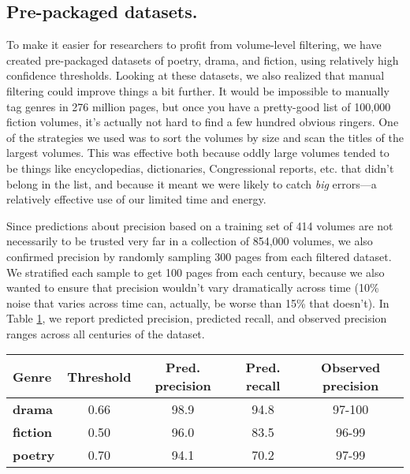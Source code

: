 \documentclass[paper=a4, fontsize=12pt]{scrartcl}
\numberwithin{equation}{section}		%
\numberwithin{figure}{section}			%
\numberwithin{table}{section}				%
\begin{document}
\subsection{Pre-packaged datasets.}

To make it easier for researchers to profit from volume-level filtering, we have created pre-packaged datasets of poetry, drama, and fiction, using relatively high confidence thresholds. Looking at these datasets, we also realized that manual filtering could improve things a bit further. It would be impossible to manually tag genres in 276 million pages, but once you have a pretty-good list of 100,000 fiction volumes, it's actually not hard to find a few hundred obvious ringers. One of the strategies we used was to sort the volumes by size and scan the titles of the largest volumes. This was effective both because oddly large volumes tended to be things like encyclopedias, dictionaries, Congressional reports, etc. that didn't belong in the list, and because it meant we were likely to catch \textit{big} errors---a relatively effective use of our limited time and energy.

Since predictions about precision based on a training set of 414 volumes are not necessarily to be trusted very far in a collection of 854,000 volumes, we also confirmed precision by randomly sampling 300 pages from each filtered dataset. We stratified each sample to get 100 pages from each century, because we also wanted to ensure that precision wouldn't vary dramatically across time (10\% noise that varies across time can, actually, be worse than 15\% that doesn't). In Table \ref{filteredtable}, we report predicted precision, predicted recall, and observed precision ranges across all centuries of the dataset.

\vspace{5mm}
\begin{table}[h]
\begin{tabular}{@{}lcccc@{}}
\toprule
\textbf{Genre}   & \textbf{Threshold} & \textbf{Pred. precision} & \textbf{Pred. recall} & \textbf{Observed precision} \\ \midrule
\textbf{drama}   & 0.66               & 98.9                     & 94.8                  & 97-100                      \\
\textbf{fiction} & 0.50               & 96.0                     & 83.5                  & 96-99                       \\
\textbf{poetry}  & 0.70               & 94.1                     & 70.2                  & 97-99                      
\end{tabular}
\label{filteredtable}
\end{table}
\vspace{5mm}
\end{document}
